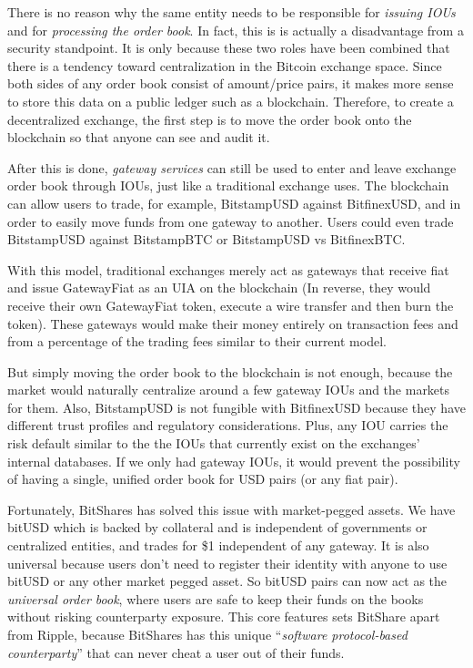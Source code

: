 There is no reason why the same entity needs to be responsible for
\emph{issuing IOUs} and for \emph{processing the order book}. In fact, this is
is actually a disadvantage from a security standpoint. It is only because these
two roles have been combined that there is a tendency toward centralization in
the Bitcoin exchange space. Since both sides of any order book consist of
amount/price pairs, it makes more sense to store this data on a public ledger
such as a blockchain. Therefore, to create a decentralized exchange, the first
step is to move the order book onto the blockchain so that anyone can see and
audit it.

After this is done, \emph{gateway services} can still be used to enter and
leave exchange order book through IOUs, just like a traditional exchange uses.
The blockchain can allow users to trade, for example, BitstampUSD against
BitfinexUSD, and in order to easily move funds from one gateway to another.
Users could even trade BitstampUSD against BitstampBTC or BitstampUSD vs
BitfinexBTC.

With this model, traditional exchanges merely act as gateways that receive fiat
and issue GatewayFiat as an UIA on the blockchain (In reverse, they would
receive their own GatewayFiat token, execute a wire transfer and then burn the
token). These gateways would make their money entirely on transaction fees and
from a percentage of the trading fees similar to their current model.

But simply moving the order book to the blockchain is not enough, because the
market would naturally centralize around a few gateway IOUs and the markets for
them. Also, BitstampUSD is not fungible with BitfinexUSD because they have
different trust profiles and regulatory considerations. Plus, any IOU carries
the risk default similar to the the IOUs that currently exist on the exchanges'
internal databases. If we only had gateway IOUs, it would prevent the
possibility of having a single, unified order book for USD pairs (or any fiat
pair).

Fortunately, BitShares has solved this issue with market-pegged assets. We have
bitUSD which is backed by collateral and is independent of governments or
centralized entities, and trades for \$1 independent of any gateway. It is also
universal because users don't need to register their identity with anyone to
use bitUSD or any other market pegged asset. So bitUSD pairs can now act as the
\emph{universal order book}, where users are safe to keep their funds on the
books without risking counterparty exposure. This core features sets BitShare
apart from Ripple, because BitShares has this unique ``\emph{software
protocol-based counterparty}'' that can never cheat a user out of their funds.
